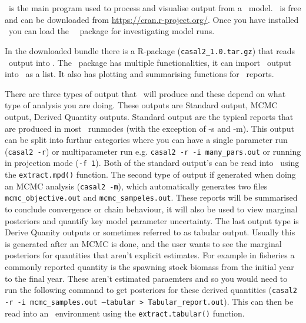 \section{ \label{sec:post-processing}}

\R\ is the main program used to process and visualise output from a \CNAME\ model. \R\ is free and can be downloaded from \url{https://cran.r-project.org/}. Once you have installed \R\ you can load the \cname\ \R\ package for investigating model runs. 

In the downloaded bundle there is a R-package (\texttt{casal2\_1.0.tar.gz}) that reads \CNAME\ output into \R. The \CNAME\ package has multiple functionalities, it can import \CNAME\ output into \R\ as a list. It also has plotting and summarising functions for \CNAME\ reports.

There are three types of output that \CNAME\ will produce and these depend on what type of analysis you are doing. These outputs are Standard output, MCMC output, Derived Quantity outputs. Standard output are the typical reports that are produced in most \CNAME\ runmodes (with the exception of -s and -m). This output can be split into furthur categories where you can have a single parameter run (\texttt{casal2 -r}) or multiparameter run e.g. \texttt{casal2 -r -i many\_pars.out} or running in projection mode (\texttt{-f 1}). Both of the standard output's can be read into \R\ using the \texttt{extract.mpd()} function. The second type of output if generated when doing an MCMC analysis (\texttt{casal2 -m}), which automatically generates two files \texttt{mcmc\_objective.out} and \texttt{mcmc\_sampeles.out}. These reports will be summarised to conclude convergence or chain behaviour, it will also be used to view marginal posteriors and quantify key model parameter uncertainty. The last output type is Derive Quanity outputs or sometimes referred to as tabular output. Usually this is generated after an MCMC is done, and the user wants to see the marginal posteriors for quantities that aren't explicit estimates. For example in fisheries a commonly reported quantity is the spawning stock biomass from the initial year to the final year. These aren't estimated paraemters and so you would need to run the following command to get posteriors for these derived quantities (\texttt{casal2 -r -i mcmc\_samples.out --tabular > Tabular\_report.out}). This can then be read into an \R\ environment using the \texttt{extract.tabular()} function.



